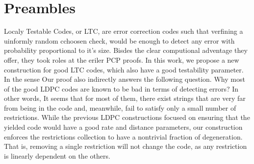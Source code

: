 \section{Preambles}

Localy Testable Codes, or LTC, are error correction codes such that verfining a uinformly random cchoosen check, would be enough to detect any error with probability proportional to it's size. Bisdes the clear computional adventage they offer, they took roles at the eriler PCP proofs.  
  In this work, we propose a new construction for good LTC codes, which also have a good testability parameter. In the sense   Our proof also indirectly answers the following question. Why most of the good LDPC codes are known to be bad in terms of detecting errors? In other words, It seems that for most of them, there exist strings that are very far from being in the code and, meanwhile, fail to satisfy only a small number of restrictions.
  While the previous LDPC constructions focused on ensuring that the yielded code would have a good rate and distance parameters, our construction enforces the restrictions collection to have a nontrivial fraction of degeneration. That is, removing a single restriction will not change the code, as any restriction is linearly dependent on the others.


